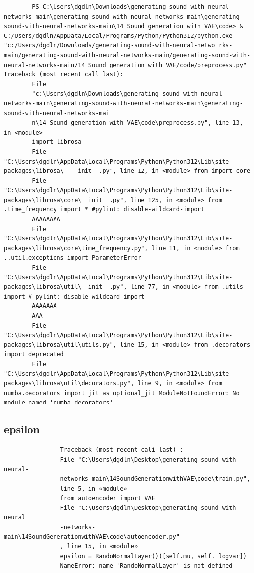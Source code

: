 \documentclass[12pt, a4paper]{article}
\begin{document}
	\begin{verbatim}
		PS C:\Users\dgdln\Downloads\generating-sound-with-neural-networks-main\generating-sound-with-neural-networks-main\generating-sound-with-neural-networks-main\14 Sound generation with VAE\code> & C:/Users/dgdln/AppData/Local/Programs/Python/Python312/python.exe "c:/Users/dgdln/Downloads/generating-sound-with-neural-netwo rks-main/generating-sound-with-neural-networks-main/generating-sound-with-neural-networks-main/14 Sound generation with VAE/code/preprocess.py" Traceback (most recent call last):
		File
		"c:\Users\dgdln\Downloads\generating-sound-with-neural-networks-main\generating-sound-with-neural-networks-main\generating-sound-with-neural-networks-mai
		n\14 Sound generation with VAE\code\preprocess.py", line 13, in <module>
		import librosa
		File "C:\Users\dgdln\AppData\Local\Programs\Python\Python312\Lib\site-packages\librosa\____init__.py", line 12, in <module> from import core
		File "C:\Users\dgdln\AppData\Local\Programs\Python\Python312\Lib\site-packages\librosa\core\__init__.py", line 125, in <module> from .time_frequency import * #pylint: disable-wildcard-import
		ΑΑΑΑΑΑΑΑ
		File "C:\Users\dgdln\AppData\Local\Programs\Python\Python312\Lib\site-packages\librosa\core\time_frequency.py", line 11, in <module> from ..util.exceptions import ParameterError
		File "C:\Users\dgdln\AppData\Local\Programs\Python\Python312\Lib\site-packages\librosa\util\__init__.py", line 77, in <module> from .utils import # pylint: disable wildcard-import
		ΑΑΑΑΑΑΑ
		ΑΛΛ
		File "C:\Users\dgdln\AppData\Local\Programs\Python\Python312\Lib\site-packages\librosa\util\utils.py", line 15, in <module> from .decorators import deprecated
		File "C:\Users\dgdln\AppData\Local\Programs\Python\Python312\Lib\site-packages\librosa\util\decorators.py", line 9, in <module> from numba.decorators import jit as optional_jit ModuleNotFoundError: No module named 'numba.decorators'
	\end{verbatim}

\vspace*{2\baselineskip}
			\subsection{epsilon}
			\begin{verbatim}
				Traceback (most recent cali last) :
				File "C:\Users\dgdln\Desktop\generating-sound-with-neural-
				networks-main\14SoundGenerationwithVAE\code\train.py", 
				line 5, in «module»
				from autoencoder import VAE
				File "C:\Users\dgdln\Desktop\generating-sound-with-neural
				-networks-main\14SoundGenerationwithVAE\code\autoencoder.py"
				, line 15, in «module»
				epsilon = RandoNormalLayer()([self.mu, self. logvar])
				NameError: name 'RandoNormalLayer' is not defined	
			\end{verbatim}
			
\end{document}
